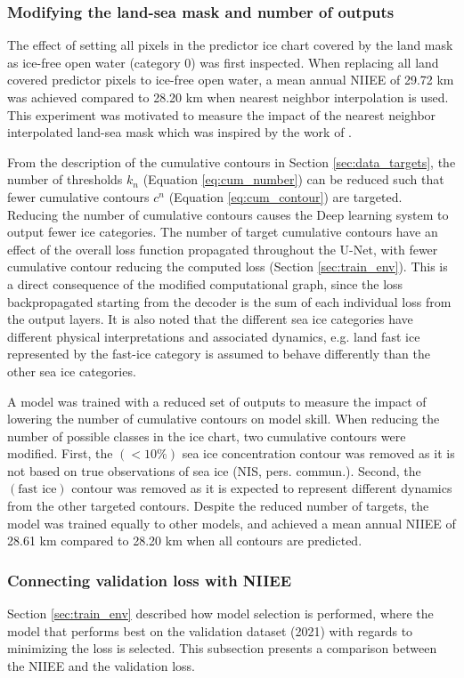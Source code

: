 \documentclass[../main/thesis]{subfiles}
\begin{document}
\subsubsection{Modifying the land-sea mask and number of outputs}
\label{sec:modifyhyperparam}
The effect of setting all pixels in the predictor ice chart covered by the land mask as ice-free open water (category 0) was first inspected. When replacing all land covered predictor pixels to ice-free open water, a mean annual NIIEE of 29.72 km was achieved compared to 28.20 km when nearest neighbor interpolation is used. This experiment was motivated to measure the impact of the nearest neighbor interpolated land-sea mask which was inspired by the work of \citet{Wang2017}.

From the description of the cumulative contours in Section \ref{sec:data_targets}, the number of thresholds $k_n$ (Equation \ref{eq:cum_number}) can be reduced such that fewer cumulative contours $c^n$ (Equation \ref{eq:cum_contour}) are targeted. Reducing the number of cumulative contours causes the Deep learning system to output fewer ice categories. The number of target cumulative contours have an effect of the overall loss function propagated throughout the U-Net, with fewer cumulative contour reducing the computed loss (Section \ref{sec:train_env}). This is a direct consequence of the modified computational graph, since the loss backpropagated starting from the decoder is the sum of each individual loss from the output layers. It is also noted that the different sea ice categories have different physical interpretations and associated dynamics, e.g. land fast ice represented by the fast-ice category is assumed to behave differently than the other sea ice categories.

A model was trained with a reduced set of outputs to measure the impact of lowering the number of cumulative contours on model skill. When reducing the number of possible classes in the ice chart, two cumulative contours were modified. First, the $(< 10\%)$ sea ice concentration contour was removed as it is not based on true observations of sea ice (NIS, pers. commun.). Second, the $(\text{fast ice})$ contour was removed as it is expected to represent different dynamics from the other targeted contours. Despite the reduced number of targets, the model was trained equally to other models, and achieved a mean annual NIIEE of 28.61 km compared to 28.20 km when all contours are predicted.

\subsubsection{Connecting validation loss with NIIEE}
\label{sec:connecting_val_loss_with_NIIEE}
Section \ref{sec:train_env} described how model selection is performed, where the model that performs best on the validation dataset (2021) with regards to minimizing the loss is selected. This subsection presents a comparison between the NIIEE and the validation loss.
\end{document}
